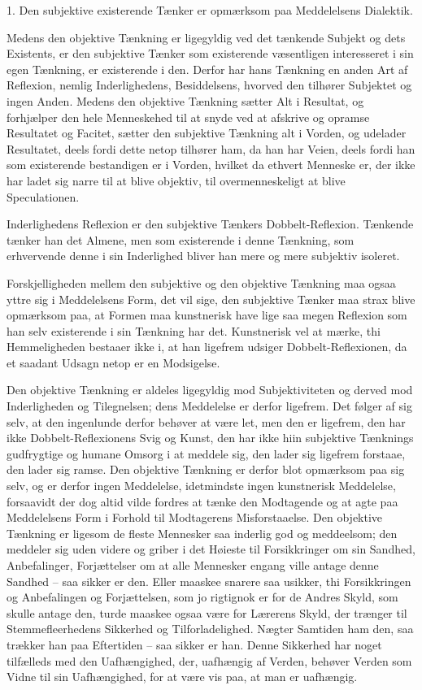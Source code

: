 \documentclass[12pt,a4paper]{article}
\begin{document}
1. Den subjektive existerende Tænker er opmærksom paa Meddelelsens Dialektik.

Medens den objektive Tænkning er ligegyldig ved det tænkende Subjekt og dets Existents, er den subjektive Tænker som existerende væsentligen interesseret i sin egen Tænkning, er existerende i den. Derfor har hans Tænkning en anden Art af Reflexion, nemlig Inderlighedens, Besiddelsens, hvorved den tilhører Subjektet og ingen Anden. Medens den objektive Tænkning sætter Alt i Resultat, og forhjælper den hele Menneskehed til at snyde ved at afskrive og opramse Resultatet og Facitet, sætter den subjektive Tænkning alt i Vorden, og udelader Resultatet, deels fordi dette netop tilhører ham, da han har Veien, deels fordi han som existerende bestandigen er i Vorden, hvilket da ethvert Menneske er, der ikke har ladet sig narre til at blive objektiv, til overmenneskeligt at blive Speculationen.

Inderlighedens Reflexion er den subjektive Tænkers Dobbelt-Reflexion. Tænkende tænker han det Almene, men som existerende i denne Tænkning, som erhvervende denne i sin Inderlighed bliver han mere og mere subjektiv isoleret.

Forskjelligheden mellem den subjektive og den objektive Tænkning maa ogsaa yttre sig i Meddelelsens Form, det vil sige, den subjektive Tænker maa strax blive opmærksom paa, at Formen maa kunstnerisk have lige saa megen Reflexion som han selv existerende i sin Tænkning har det. Kunstnerisk vel at mærke, thi Hemmeligheden bestaaer ikke i, at han ligefrem udsiger Dobbelt-Reflexionen, da et saadant Udsagn netop er en Modsigelse.

Den objektive Tænkning er aldeles ligegyldig mod Subjektiviteten og derved mod Inderligheden og Tilegnelsen; dens Meddelelse er derfor ligefrem. Det følger af sig selv, at den ingenlunde derfor behøver at være let, men den er ligefrem, den har ikke Dobbelt-Reflexionens Svig og Kunst, den har ikke hiin subjektive Tænknings gudfrygtige og humane Omsorg i at meddele sig, den lader sig ligefrem forstaae, den lader sig ramse. Den objektive Tænkning er derfor blot opmærksom paa sig selv, og er derfor ingen Meddelelse, idetmindste ingen kunstnerisk Meddelelse, forsaavidt der dog altid vilde fordres at tænke den Modtagende og at agte paa Meddelelsens Form i Forhold til Modtagerens Misforstaaelse. Den objektive Tænkning er ligesom de fleste Mennesker saa inderlig god og meddeelsom; den meddeler sig uden videre og griber i det Høieste til Forsikkringer om sin Sandhed, Anbefalinger, Forjættelser om at alle Mennesker engang ville antage denne Sandhed – saa sikker er den. Eller maaskee snarere saa usikker, thi Forsikkringen og Anbefalingen og Forjættelsen, som jo rigtignok er for de Andres Skyld, som skulle antage den, turde maaskee ogsaa være for Lærerens Skyld, der trænger til Stemmefleerhedens Sikkerhed og Tilforladelighed. Nægter Samtiden ham den, saa trækker han paa Eftertiden – saa sikker er han. Denne Sikkerhed har noget tilfælleds med den Uafhængighed, der, uafhængig af Verden, behøver Verden som Vidne til sin Uafhængighed, for at være vis paa, at man er uafhængig.
\end{document}
